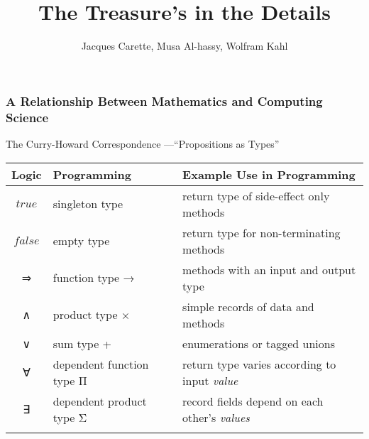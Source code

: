 \documentclass[serif,mathserif,10pt]{beamer}
\title{The Treasure's in the Details}
\author[Carette, Al-hassy, Kahl]{Jacques Carette, Musa Al-hassy, Wolfram Kahl}
\institute[McMaster]{McMaster University, Hamilton}
\begin{document}



\begin{frame} \frametitle{A Relationship Between Mathematics and Computing Science}

  \begin{block}{ The Curry-Howard Correspondence \hfill{\small ---``Propositions as Types''} }
    \begin{tabular}{cll}
      \textbf{Logic} & \textbf{Programming} & Example Use in Programming \\ \hline
      
      $true$ & singleton type
           &{\footnotesize return type of side-effect only methods} \\

      $false$ & empty type
           &{\footnotesize return type for non-terminating methods } \\ \hline\pause

      ⇒ & function type \hfill →
         &{\footnotesize methods with an input and output type } \\

      ∧ & product type \hfill ×
         &{\footnotesize simple records of data and methods } \\

      ∨ & sum type \hfill +
         &{\footnotesize enumerations or tagged unions} \\ \hline\pause
      
      ∀ & dependent function type \hfill Π
         & {\footnotesize return type varies according to input \emph{value} } \\
      
      ∃ & dependent product type \hfill Σ
         &{\footnotesize record fields depend on each other's \emph{values} } \\ \hline\pause
      

\end{tabular}
\end{block}
\end{frame}
\end{document}
